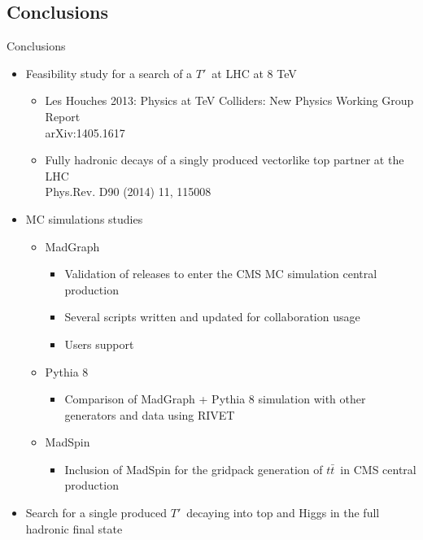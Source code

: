 \documentclass[usenames,dvipsnames]{beamer}
\newcommand{\ttbar}{$t\bar{t}$}
\newcommand{\Tp}{$T'$}
\begin{document}
\subsection{Conclusions}
\begin{frame}{Conclusions}
\vspace{-.5cm}
\begin{block}{}
\begin{itemize}\scriptsize
  \item Feasibility study for a search of a \Tp~at LHC at 8 TeV
    \begin{itemize}\tiny
      \item Les Houches 2013: Physics at TeV Colliders: New Physics Working Group Report \\arXiv:1405.1617
      \item Fully hadronic decays of a singly produced vectorlike top partner at the LHC \\Phys.Rev. D90 (2014) 11, 115008
    \end{itemize}
  \item MC simulations studies
    \begin{itemize}\scriptsize
      \item MadGraph
        \begin{itemize}\tiny
          \item Validation of releases to enter the CMS MC simulation central production
          \item Several scripts written and updated for collaboration usage
          \item Users support
        \end{itemize}
      \item Pythia 8
        \begin{itemize}\tiny
          \item Comparison of MadGraph + Pythia 8 simulation with other generators and data using RIVET
        \end{itemize}
      \item MadSpin        
        \begin{itemize}\tiny
          \item Inclusion of MadSpin for the gridpack generation of \ttbar~in CMS central production
        \end{itemize}
    \end{itemize}
  \item Search for a single produced \Tp~decaying into top and Higgs in the full hadronic final state
\end{itemize}
\end{block}
\end{frame}
\end{document}
